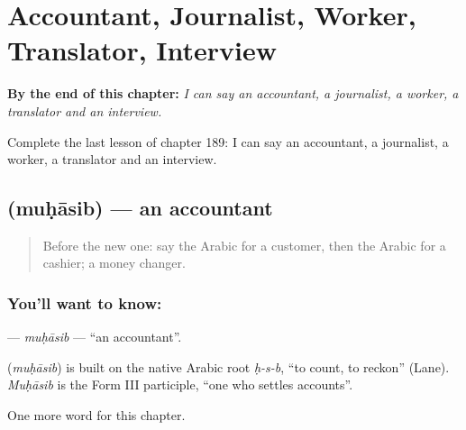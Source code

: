 
\chapter{Accountant, Journalist, Worker, Translator, Interview}
\label{ch:ar-accountant-journalist-worker-translator-interview}

\begin{chapteropening}
\textbf{By the end of this chapter:} \emph{I can say an accountant, a journalist, a worker, a translator and an interview.}

Complete the last lesson of chapter 189: I can say an accountant, a journalist, a worker, a translator and an interview.
\end{chapteropening}

\section[\texorpdfstring{\ar{محاسب} (muḥāsib)}{محاسب (muḥāsib)}]{ (muḥāsib) — an accountant}

\label{lesson:AR-C189-muhasib}



\begin{quote}
Before the new one: say the Arabic for a customer, then the Arabic for a cashier; a money changer.
\end{quote}

\subsection*{You'll want to know: }
\textbf{} — \emph{muḥāsib} — \textquotedblleft{}an accountant\textquotedblright{}.

\begin{cousinweb}
\textbf{} (\emph{muḥāsib}) is built on the native Arabic root \emph{ḥ-s-b}, \textquotedblleft{}to count, to reckon\textquotedblright{} (Lane). \emph{Muḥāsib} is the Form III participle, \textquotedblleft{}one who settles accounts\textquotedblright{}.
\end{cousinweb}

\begin{grammarlens}[title={What you've built}]
One more word for this chapter.
\end{grammarlens}

